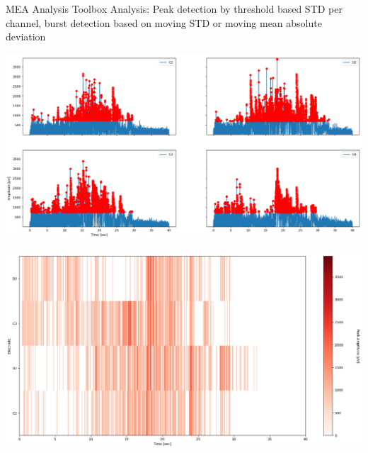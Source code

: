 \documentclass[10pt]{beamer}
\begin{document}
\begin{frame}[allowframebreaks]{MEA Analysis Toolbox}
     Analysis: Peak detection by threshold based STD per channel, burst detection based on moving STD or moving mean absolute deviation \\
      \begin{center}
       \includegraphics[keepaspectratio,width=\framewidth]{img/4_peaks_amplitude.png}
      \end{center}
      \framebreak
      \begin{center}
      \includegraphics[keepaspectratio,width=\framewidth]{img/4_raster_amplitude.png}
      \end{center}
      \framebreak
      

\end{frame}
\end{document}
